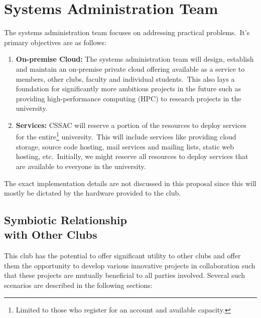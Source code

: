 

\section{\large Systems Administration Team}\label{sec:systems-administration-team}
The systems administration team focuses on addressing practical problems.\ It's primary objectives are as follows:

\begin{enumerate}
    \item \textbf{On-premise Cloud:} The systems administration team will design, establish and maintain an on-premise
    private cloud offering available as a service to members, other clubs, faculty and individual students.\ This also
    lays a foundation for significantly more ambitious projects in the future such as providing high-performance
    computing (HPC) to research projects in the university.
    \item \textbf{Services:} CSSAC will reserve a portion of the resources to deploy services for the
    entire\footnote{Limited to those who register for an account and available capacity.} university.\ This will include
    services like providing cloud storage, source code hosting, mail services and mailing lists, static web hosting,
    etc.\ Initially, we might reserve all resources to deploy services that are available to everyone in the university.
\end{enumerate}

The exact implementation details are not discussed in this proposal since this will mostly be dictated by the
hardware provided to the club.


\subsection[Symbiotic Relationship with Other Clubs]{Symbiotic Relationship \\ with Other Clubs}
\label{subsec:symbiotic-relationship-with-other-clubs}
This club has the potential to offer significant utility to other clubs and offer them the opportunity to develop
various innovative projects in collaboration such that these projects are mutually beneficial to all parties involved.
Several such scenarios are described in the following sections:

